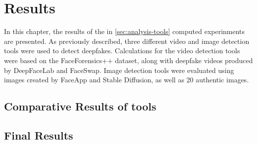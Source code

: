 
\chapter{Results}\label{chapter:results}
In this chapter, the results of the in \autoref{sec:analysis-tools} computed experinments are 
presented. As previously described, three different video and image detection tools were used
to detect deepfakes. Calculations for the video detection tools were based on the 
FaceForensics++ dataset, along with deepfake videos produced by DeepFaceLab and FaceSwap.
Image detection tools were evaluated using images created by FaceApp and Stable Diffusion,
as well as 20 authentic images.

\section{Comparative Results of tools}


\section{Final Results}
